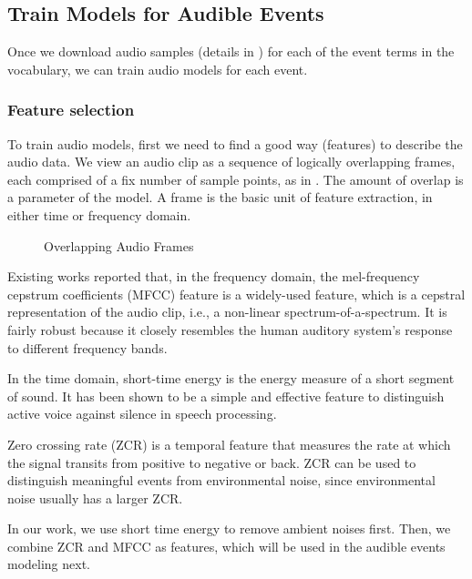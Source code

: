 \subsection{Train Models for Audible Events} 
\label{sec:audiotrain}

Once we download audio samples (details in )
for each of the event terms in the vocabulary,
we can train audio models for each event. 

\subsubsection{Feature selection}
To train audio models, first we need to find a good way (features) 
to describe the audio data. 
We view an audio clip as a sequence of logically overlapping frames, 
each comprised of a fix number of sample points, as in .
The amount of overlap is a parameter of the model.
A frame is the basic unit of feature extraction, 
in either time or frequency domain. 

\begin{figure}[th]
\centering
{}
\caption{Overlapping Audio Frames}
\label{fig:fra}
\end{figure}

Existing works\cite{1561288,1621215,mitrovic2010features,4761905} reported
that, in the frequency domain, the mel-frequency cepstrum coefficients (MFCC) 
feature is a widely-used feature, which is a cepstral representation 
of the audio clip, i.e., a non-linear spectrum-of-a-spectrum. 
It is fairly robust because it closely resembles the human auditory system's
response to different frequency bands.

In the time domain, short-time energy is the energy measure of a short segment
of sound. It has been shown to be a simple and 
effective feature to distinguish active voice against silence in
speech processing\cite{1181092}. 

Zero crossing rate (ZCR) is a temporal feature that measures the rate 
at which the signal transits from positive to negative or back. 
ZCR can be used to distinguish meaningful events from environmental noise, 
since environmental noise usually has a larger ZCR.

In our work, we use short time energy to remove ambient noises first. 
Then, we combine ZCR and MFCC as features, which will be used in the
audible events modeling next.

